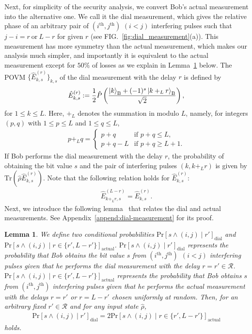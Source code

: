 \documentclass[twocolumn,superscriptaddress,pra,footinbib,notitlepage]{revtex4-1}
\newcommand{\tr}[1]{\mathrm{Tr}\left(#1\right)}
\newcommand{\1}{\mbox{1}\hspace{-0.25em}\mbox{l}}
\newcommand{\cpr}[2]{\mathrm{Pr}\left[#1\middle|#2\right]}
\newtheorem{lem}{Lemma}
\begin{document}
Next, for simplicity of the security analysis, we convert Bob's actual measurement into the alternative one. We call it the dial measurement, which gives the relative phase of an arbitrary pair of $(i^\textrm{th}, j^\textrm{th})$ $(i<j)$ interfering pulses such that $j-i=r~\textrm{or}~L-r$ for given $r$ (see FIG.~\ref{fig:dial_measurement}(a)).
This measurement has more symmetry than the actual measurement, which makes our analysis much simpler, and importantly it is equivalent to the actual measurement except for $50\%$ of losses as we explain in Lemma~\ref{fact:dial-actual-relation} below.
The POVM $\{\hat{E}_{k, s}^{(r)}\}_{k, s}$ of the dial measurement with the delay $r$ is defined by 
\begin{align}
\hat{E}_{k, s}^{(r)}:=\frac{1}{2}\hat{P}\left(\frac{\ket{k}_\textrm{B}+(-1)^s\ket{k+_Lr}_\textrm{B}}{\sqrt{2}}\right),\label{eq:dial-measurement-povm}
\end{align}
for $1\leq k\leq L$. Here, $+_L$ denotes the summation in modulo $L$, namely, for integers $(p, q)$ with $1\leq p\leq L$ and $1\leq q \leq L$,
\begin{align}
p+_Lq=
\begin{cases}
p+q&\textrm{if }p+q\leq L,\\
p+q-L&\textrm{if }p+q\geq L+1.
\end{cases}
\end{align}
If Bob performs the dial measurement with the delay $r$, the probability of obtaining the bit value $s$ and the pair of interfering pulses $(k, k+_Lr)$ is given by $\tr{\hat{\rho}\hat{E}_{k, s}^{(r)}}$. Note that the following relation holds for $\hat{E}_{k,s}^{(r)}$:
\begin{align}
\hat{E}_{k+_Lr, s}^{(L-r)}=\hat{E}_{k, s}^{(r)}.\label{eq:dial_r_L-r}
\end{align}
Next, we introduce the following lemma~\cite{sasaki2014practical} that relates the dial and actual measurements.
See Appendix~\ref{append:dial-measurement} for its proof. 
\begin{lem}
We define two conditional probabilities $\cpr{s\wedge(i, j)}{r'}_\mathrm{dial}$ and $\cpr{s\wedge(i,j)}{r\in\{r', L-r'\}}_\mathrm{actual}$. $\cpr{s\wedge(i, j)}{r'}_\mathrm{dial}$ represents the probability that Bob obtains the bit value $s$ from $(i^\mathrm{th}, j^{\mathrm{th}})~~(i<j)$ interfering pulses given that he performs the dial measurement with the delay $r=r'\in\mathcal{R}$.
$\cpr{s\wedge(i,j)}{r\in\{r', L-r'\}}_\mathrm{actual}$ represents the probability that Bob obtains $s$ from $(i^\mathrm{th}, j^{\mathrm{th}})$ interfering pulses given that he performs the actual measurement with the delays $r=r'$ or $r=L-r'$ chosen uniformly at random. Then, for an arbitrary fixed $r'\in\mathcal{R}$ and for any input state $\hat{\rho}$,
\begin{align}
\cpr{s\wedge(i, j)}{r'}_\mathrm{dial}=2\cpr{s\wedge(i,j)}{r\in\{r', L-r'\}}_\mathrm{actual}\label{eq:dial-actual}
\end{align}
holds.
\label{fact:dial-actual-relation}
\end{lem}
\end{document}
